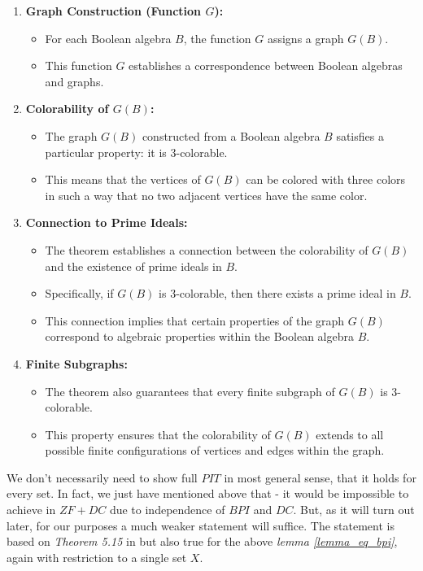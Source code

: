\begin{enumerate}
    \item \textbf{Graph Construction (Function $G$):}
    \begin{itemize}
        \item For each Boolean algebra $B$, the function $G$ assigns a graph $G(B)$.
        \item This function $G$ establishes a correspondence between Boolean algebras and graphs.
    \end{itemize}
    
    \item \textbf{Colorability of $G(B)$:}
    \begin{itemize}
        \item The graph $G(B)$ constructed from a Boolean algebra $B$ satisfies a particular property: it is 3-colorable.
        \item This means that the vertices of $G(B)$ can be colored with three colors in such a way that no two adjacent vertices have the same color.
    \end{itemize}
    
    \item \textbf{Connection to Prime Ideals:}
    \begin{itemize}
        \item The theorem establishes a connection between the colorability of $G(B)$ and the existence of prime ideals in $B$.
        \item Specifically, if $G(B)$ is 3-colorable, then there exists a prime ideal in $B$.
        \item This connection implies that certain properties of the graph $G(B)$ correspond to algebraic properties within the Boolean algebra $B$.
    \end{itemize}
    
    \item \textbf{Finite Subgraphs:}
    \begin{itemize}
        \item The theorem also guarantees that every finite subgraph of $G(B)$ is 3-colorable.
        \item This property ensures that the colorability of $G(B)$ extends to all possible finite configurations of vertices and edges within the graph.
    \end{itemize}
\end{enumerate}

We don't necessarily need to show full $PIT$ in most general sense, that it holds for every set. In fact, we just have mentioned above that - it would be impossible to achieve in $ZF + DC$ due to independence of $BPI$ and $DC$. But, as it will turn out later, for our purposes a much weaker statement will suffice. The statement is based on \textit{Theorem 5.15} in \cite{halbeisen2012} but also true for the above \textit{lemma \ref{lemma_eq_bpi}}, again with restriction to a single set $X$.

